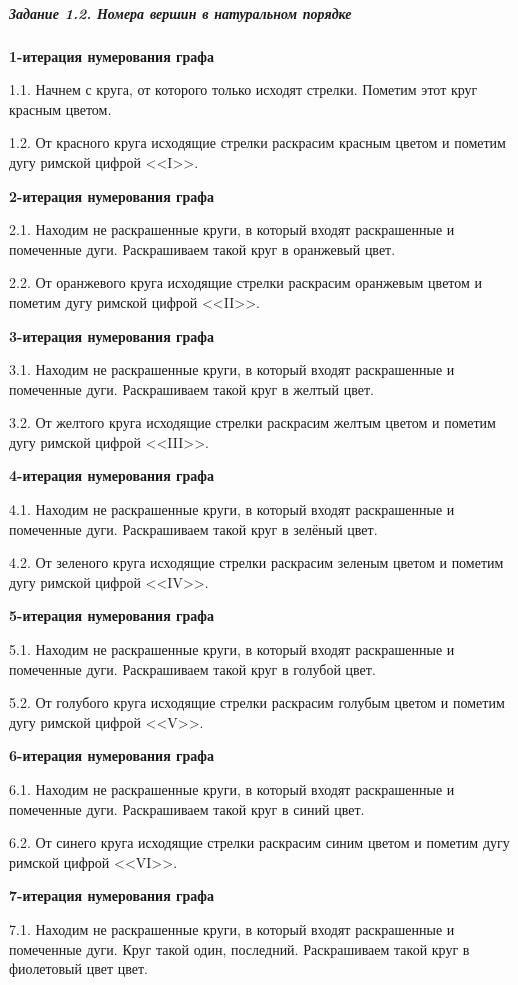 \subparagraph{Задание 1.2. Номера вершин в натуральном порядке} \hspace{0pt}

\textbf{1-итерация нумерования графа}

1.1. Начнем с круга, от которого только исходят стрелки. Пометим этот круг красным цветом.

1.2. От красного круга исходящие стрелки раскрасим красным цветом и пометим дугу римской цифрой <<I>>.

\textbf{2-итерация нумерования графа}

2.1. Находим не раскрашенные круги, в который входят раскрашенные и помеченные дуги. Раскрашиваем такой круг в оранжевый цвет.

2.2. От оранжевого круга исходящие стрелки раскрасим оранжевым цветом и пометим дугу римской цифрой <<II>>.

\textbf{3-итерация нумерования графа}

3.1. Находим не раскрашенные круги, в который входят раскрашенные и помеченные дуги. Раскрашиваем такой круг в желтый цвет.

3.2. От желтого круга исходящие стрелки раскрасим желтым цветом и пометим дугу римской цифрой <<III>>.

\textbf{4-итерация нумерования графа}

4.1. Находим не раскрашенные круги, в который входят раскрашенные и помеченные дуги. Раскрашиваем такой круг в зелёный цвет.

4.2. От зеленого круга исходящие стрелки раскрасим зеленым цветом и пометим дугу римской цифрой <<IV>>.

\textbf{5-итерация нумерования графа}

5.1. Находим не раскрашенные круги, в который входят раскрашенные и помеченные дуги. Раскрашиваем такой круг в голубой цвет.

5.2. От голубого круга исходящие стрелки раскрасим голубым цветом и пометим дугу римской цифрой <<V>>.

\textbf{6-итерация нумерования графа}

6.1. Находим не раскрашенные круги, в который входят раскрашенные и помеченные дуги. Раскрашиваем такой круг в синий цвет.

6.2. От синего круга исходящие стрелки раскрасим синим цветом и пометим дугу римской цифрой <<VI>>.

\textbf{7-итерация нумерования графа}

7.1. Находим не раскрашенные круги, в который входят раскрашенные и помеченные дуги. Круг такой один, последний. Раскрашиваем такой круг в фиолетовый цвет цвет.


